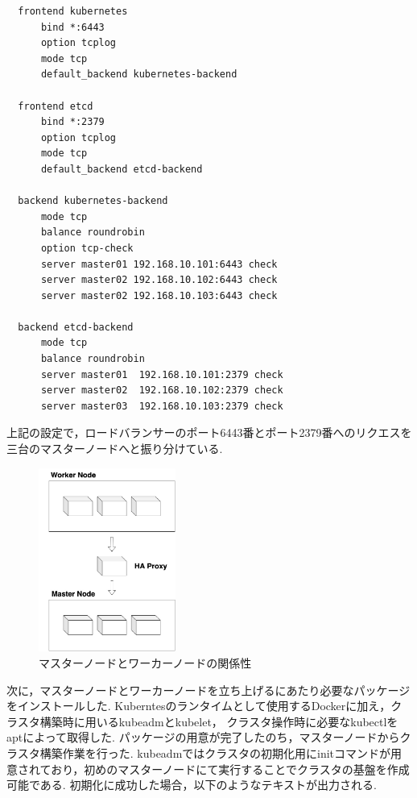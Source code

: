 \begin{lstlisting}
  frontend kubernetes
      bind *:6443
      option tcplog
      mode tcp
      default_backend kubernetes-backend

  frontend etcd
      bind *:2379
      option tcplog
      mode tcp
      default_backend etcd-backend

  backend kubernetes-backend
      mode tcp
      balance roundrobin
      option tcp-check
      server master01 192.168.10.101:6443 check
      server master02 192.168.10.102:6443 check
      server master02 192.168.10.103:6443 check

  backend etcd-backend
      mode tcp
      balance roundrobin
      server master01  192.168.10.101:2379 check
      server master02  192.168.10.102:2379 check
      server master03  192.168.10.103:2379 check
\end{lstlisting}

上記の設定で，ロードバランサーのポート6443番とポート2379番へのリクエスを三台のマスターノードへと振り分けている.

\begin{figure}[htbp]
  \begin{center}
    \includegraphics[width=0.4\textwidth]{./figures/haproxy.jpg}
    \caption{マスターノードとワーカーノードの関係性}
  \end{center}
\end{figure}

次に，マスターノードとワーカーノードを立ち上げるにあたり必要なパッケージをインストールした.
Kuberntesのランタイムとして使用するDockerに加え，クラスタ構築時に用いるkubeadmとkubelet， クラスタ操作時に必要なkubectlをaptによって取得した.
パッケージの用意が完了したのち，マスターノードからクラスタ構築作業を行った.
kubeadmではクラスタの初期化用にinitコマンドが用意されており，初めのマスターノードにて実行することでクラスタの基盤を作成可能である.
初期化に成功した場合，以下のようなテキストが出力される.\\

